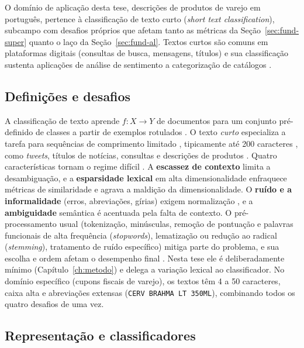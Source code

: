 O domínio de aplicação desta tese, descrições de produtos de varejo em
português, pertence à classificação de texto curto (\textit{short text
classification}), subcampo com desafios próprios que afetam tanto as
métricas da Seção~\ref{sec:fund-super} quanto o laço da
Seção~\ref{sec:fund-al}. Textos curtos são comuns em plataformas digitais
(consultas de busca, mensagens, títulos) e sua classificação sustenta
aplicações de análise de sentimento a categorização de catálogos
\cite{Ahmed2022, Song2014}.

\subsection{Definições e desafios}
\label{subsec:stc_desafios}

A classificação de texto aprende $f: X \rightarrow Y$ de documentos para um
conjunto pré-definido de classes a partir de exemplos rotulados
\cite{Aggarwal2012, Kowsari2019}. O texto \emph{curto} especializa a tarefa
para sequências de comprimento limitado \cite{Song2014}, tipicamente até 200
caracteres \cite{Alsmadi2019}, como \textit{tweets}, títulos de notícias,
consultas e descrições de produtos \cite{Daru2024Dissertacao}. Quatro
características tornam o regime difícil \cite{Ahmed2022, Song2014}. A
\textbf{escassez de contexto} limita a desambiguação, e a
\textbf{esparsidade lexical} em alta dimensionalidade enfraquece métricas
de similaridade e agrava a maldição da dimensionalidade. O \textbf{ruído e a
informalidade} (erros, abreviações, gírias) exigem normalização
\cite{Aliero2023}, e a \textbf{ambiguidade} semântica é acentuada pela falta
de contexto. O pré-processamento usual (tokenização, minúsculas, remoção de
pontuação e palavras funcionais de alta frequência (\textit{stopwords}),
lematização ou redução ao radical (\textit{stemming}), tratamento
de ruído específico) mitiga parte do problema, e sua escolha e ordem afetam o
desempenho final \cite{Naseem2021HateSpeech, Aliero2023}. Nesta tese ele é
deliberadamente mínimo (Capítulo~\ref{ch:metodo}) e delega a variação lexical
ao classificador. No domínio específico (cupons fiscais de varejo), os textos
têm 4 a 50 caracteres, caixa alta e abreviações extensas
(\texttt{CERV BRAHMA LT 350ML}), combinando todos os quatro desafios de uma vez.

\subsection{Representação e classificadores}
\label{subsec:stc_algoritmos}

